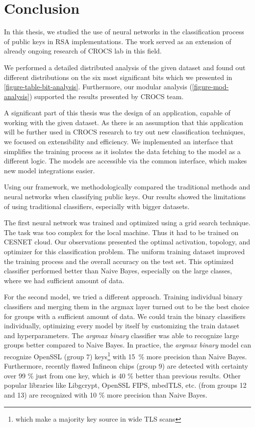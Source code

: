 \chapter{Conclusion}

In this thesis, we studied the use of neural networks in the classification process of public keys in RSA implementations. The work served as an extension of already ongoing research of CROCS lab in this field. 

We performed a detailed distributed analysis of the given dataset and found out different distributions on the six most significant bits which we presented in \autoref{figure-table-bit-analysis}. Furthermore, our modular analysis (\autoref{figure-mod-analysis}) supported the results presented by CROCS team.

A significant part of this thesis was the design of an application, capable of working with the given dataset. As there is an assumption that this application will be further used in CROCS research to try out new classification techniques, we focused on extensibility and efficiency. We implemented an interface that simplifies the training process as it isolates the data fetching to the model as a different logic. The models are accessible via the common interface, which makes new model integrations easier.

Using our framework, we methodologically compared the traditional methods and neural networks when classifying public keys. Our results showed the limitations of using traditional classifiers, especially with bigger datasets.

The first neural network was trained and optimized using a grid search technique. The task was too complex for the local machine. Thus it had to be trained on CESNET cloud. Our observations presented the optimal activation, topology, and optimizer for this classification problem. The uniform training dataset improved the training process and the overall accuracy on the test set. This optimized classifier performed better than Naive Bayes, especially on the large classes, where we had sufficient amount of data.

For the second model, we tried a different approach. Training individual binary classifiers and merging them in the argmax layer
turned out to be the best choice for groups with a sufficient amount of data. We could train the binary classifiers individually, optimizing every model by itself by customizing the train dataset and hyperparameters. The \textit{argmax binary} classifier was able to recognize large groups better compared to Naive Bayes. In practice, the \textit{argmax binary} model can recognize OpenSSL (group 7) keys\footnote{which make a majority key source in wide TLS scans} with 15~\% more precision than Naive Bayes. Furthermore, recently flawed Infineon chips (group 9) are detected with certainty over 99 \% just from one key, which is 40 \% better than previous results. Other popular libraries like Libgcrypt, OpenSSL FIPS, mbedTLS, etc. (from groups 12 and 13) are recognized with 10 \% more precision than Naive Bayes. 

